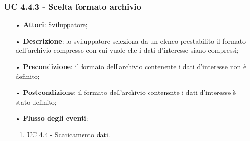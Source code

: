 \subsubsection{UC 4.4.3 - Scelta formato archivio}
\begin{itemize}
\item[•]\textbf{Attori}: Sviluppatore;
\item[•]\textbf{Descrizione}: lo sviluppatore seleziona da un elenco prestabilito il formato dell'archivio compresso con cui vuole che i dati d'interesse siano compressi;
\item[•]\textbf{Precondizione}: il formato dell'archivio contenente i dati d'interesse non è definito;
\item[•]\textbf{Postcondizione}: il formato dell'archivio contenente i dati d'interesse è stato definito;
\item[•]\textbf{Flusso degli eventi}: 
	\begin{enumerate}
	\item UC 4.4 - Scaricamento dati.
\end{enumerate}
\end{itemize}


